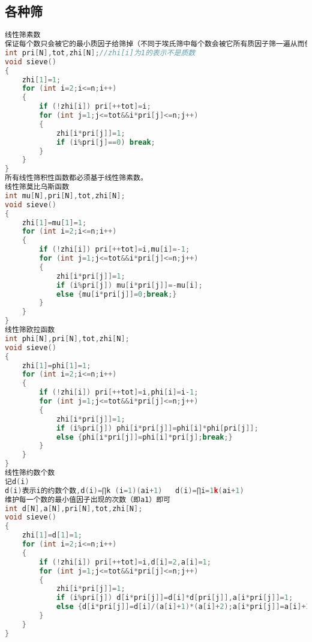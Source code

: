 \subsection{各种筛}
\begin{lstlisting}[language=c++]
线性筛素数
保证每个数只会被它的最小质因子给筛掉（不同于埃氏筛中每个数会被它所有质因子筛一遍从而使复杂度过高）
int pri[N],tot,zhi[N];//zhi[i]为1的表示不是质数
void sieve()
{
    zhi[1]=1;
    for (int i=2;i<=n;i++)
    {
        if (!zhi[i]) pri[++tot]=i;
        for (int j=1;j<=tot&&i*pri[j]<=n;j++)
        {
            zhi[i*pri[j]]=1;
            if (i%pri[j]==0) break;
        }
    }
}
所有线性筛积性函数都必须基于线性筛素数。
线性筛莫比乌斯函数
int mu[N],pri[N],tot,zhi[N];
void sieve()
{
    zhi[1]=mu[1]=1;
    for (int i=2;i<=n;i++)
    {
        if (!zhi[i]) pri[++tot]=i,mu[i]=-1;
        for (int j=1;j<=tot&&i*pri[j]<=n;j++)
        {
            zhi[i*pri[j]]=1;
            if (i%pri[j]) mu[i*pri[j]]=-mu[i];
            else {mu[i*pri[j]]=0;break;}
        }
    }
}
线性筛欧拉函数
int phi[N],pri[N],tot,zhi[N];
void sieve()
{
    zhi[1]=phi[1]=1;
    for (int i=2;i<=n;i++)
    {
        if (!zhi[i]) pri[++tot]=i,phi[i]=i-1;
        for (int j=1;j<=tot&&i*pri[j]<=n;j++)
        {
            zhi[i*pri[j]]=1;
            if (i%pri[j]) phi[i*pri[j]]=phi[i]*phi[pri[j]];
            else {phi[i*pri[j]]=phi[i]*pri[j];break;}
        }
    }
}
线性筛约数个数
记d(i)
d(i)表示i的约数个数,d(i)=∏k (i=1)(ai+1)   d(i)=∏i=1k(ai+1)
维护每一个数的最小值因子出现的次数（即a1）即可
int d[N],a[N],pri[N],tot,zhi[N];
void sieve()
{
    zhi[1]=d[1]=1;
    for (int i=2;i<=n;i++)
    {
        if (!zhi[i]) pri[++tot]=i,d[i]=2,a[i]=1;
        for (int j=1;j<=tot&&i*pri[j]<=n;j++)
        {
            zhi[i*pri[j]]=1;
            if (i%pri[j]) d[i*pri[j]]=d[i]*d[pri[j]],a[i*pri[j]]=1;
            else {d[i*pri[j]]=d[i]/(a[i]+1)*(a[i]+2);a[i*pri[j]]=a[i]+1;break;}
        }
    }
}
\end{lstlisting}

